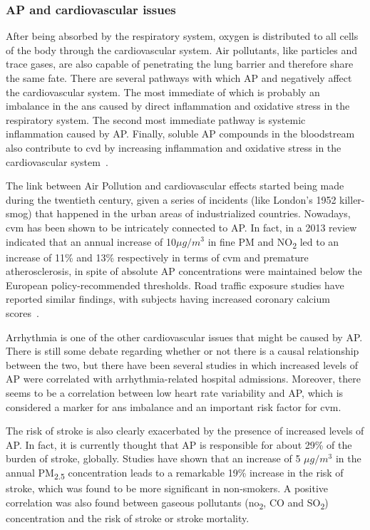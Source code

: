 \subsubsection{\acrlong{AP} and cardiovascular issues}%
\label{ssub:ap_and_cardiovascular_issues}

After being absorbed by the respiratory system, oxygen is distributed to
all cells of the body through the cardiovascular system. Air pollutants,
like particles and trace gases, are also capable of penetrating the lung
barrier and therefore share the same fate. There are several pathways
with which \gls{AP} and negatively affect the cardiovascular system. The
most immediate of which is probably an imbalance in the \gls{ans} caused
by direct inflammation and oxidative stress in the respiratory system.
The second most immediate pathway is systemic inflammation caused by
\acrlong{AP}. Finally, soluble \gls{AP} compounds in the bloodstream
also contribute to \gls{cvd} by increasing inflammation and oxidative
stress in the cardiovascular system~\cite{Brook2008, Vallero2014}.

The link between Air Pollution and cardiovascular effects started being
made during the twentieth century, given a series of incidents (like
London's 1952 killer-smog) that happened in the urban areas of
industrialized countries. Nowadays, \gls{cvm} has been shown to be
intricately connected to \gls{AP}. In fact, in a 2013 review indicated
that an annual increase of 10$\mu g / m^{3}$ in fine \gls{PM} and
NO\textsubscript{2} led to an increase of 11\% and 13\% respectively in
terms of \gls{cvm} and premature atherosclerosis, in spite of absolute
\gls{AP} concentrations were maintained below the European
policy-recommended thresholds. Road traffic exposure studies have
reported similar findings, with subjects having increased coronary
calcium scores~\cite{Bourdrel2017}.

Arrhythmia is one of the other cardiovascular issues that might be
caused by \gls{AP}. There is still some debate regarding whether or not
there is a causal relationship between the two, but there have been
several studies in which increased levels of \acrlong{AP} were
correlated with arrhythmia-related hospital admissions. Moreover, there
seems to be a correlation between low heart rate variability and
\gls{AP}, which is considered a marker for \gls{ans} imbalance and an
important risk factor for \gls{cvm}\cite{Bourdrel2017}.

The risk of stroke is also clearly exacerbated by the presence of
increased levels of \gls{AP}. In fact, it is currently thought that
\gls{AP} is responsible for about 29\% of the burden of stroke,
globally. Studies have shown that an increase of 5 $\mu g / m^{3}$ in
the annual \gls{PM}\textsubscript{2.5} concentration leads to a
remarkable 19\% increase in the risk of stroke, which was found to be
more significant in non-smokers. A positive correlation was also found
between gaseous pollutants (no\textsubscript{2}, CO and
SO\textsubscript{2}) concentration and the risk of stroke or stroke
mortality.


